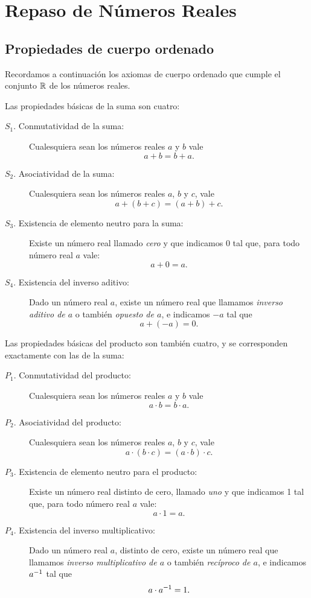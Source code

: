 \chapter{Repaso de Números Reales}
\label{Cap:Reales}

\section{Propiedades de cuerpo ordenado}

Recordamos a continuación los axiomas de cuerpo ordenado que cumple el conjunto $\mathbb{R}$ de los números reales.

Las propiedades básicas de la suma son cuatro:

\begin{description}
    \item[$S_1$. Conmutatividad de la suma:] Cualesquiera sean los números reales $a$ y $b$ vale
    \[ a+b = b+a.\]

    \item[$S_2$. Asociatividad de la suma:] Cualesquiera sean los números reales $a$, $b$ y $c$, vale
    \[
    a + (b+c) = (a+b) + c.
    \]

    \item[$S_3$. Existencia de elemento neutro para la suma:] Existe un número real llamado \emph{cero} y que indicamos 0 tal que, para todo número real $a$ vale:
    \[ a+0 = a.\]

    \item[$S_4$. Existencia del inverso aditivo:] Dado un número real $a$, existe un número real que llamamos \emph{inverso aditivo de $a$} o también \emph{opuesto de $a$}, e indicamos $-a$ tal que
    \[ a+(-a) = 0.\]

\end{description}

Las propiedades básicas del producto son también cuatro, y se corresponden exactamente con las de la suma:

\begin{description}
    \item[$P_1$. Conmutatividad del producto:] Cualesquiera sean los números reales $a$ y $b$ vale
    \[ a\cdot b = b\cdot a.\]

    \item[$P_2$. Asociatividad del producto:] Cualesquiera sean los números reales $a$, $b$ y $c$, vale
    \[
    a \cdot (b \cdot c) = (a \cdot b) \cdot c.
    \]

    \item[$P_3$. Existencia de elemento neutro para el producto:] Existe un número real distinto de cero, llamado \emph{uno} y que indicamos 1 tal que, para todo número real $a$ vale:
    \[ a \cdot 1 = a.\]

    \item[$P_4$. Existencia del inverso multiplicativo:] Dado un número real $a$, distinto de cero, existe un número real que llamamos \emph{inverso multiplicativo de $a$} o también \emph{recíproco de $a$}, e indicamos $a^{-1}$ tal que
    \[ a \cdot a^{-1} = 1.\]

\end{description}

